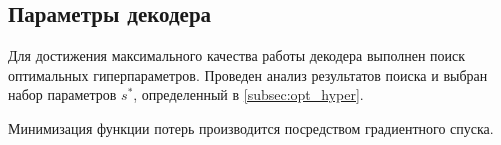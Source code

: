 \subsection{Параметры декодера}\label{subsec:arch}

Для достижения максимального качества работы декодера выполнен поиск оптимальных гиперпараметров. Проведен анализ результатов поиска и выбран набор параметров $s^*$, определенный в \ref{subsec:opt_hyper}.

Минимизация функции потерь производится посредством градиентного спуска.
